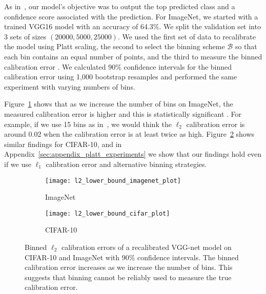 As in~\cite{guo2017calibration}, our model's objective was to output the top predicted class and a confidence score associated with the prediction. For ImageNet, we started with a trained VGG16 model with an accuracy of 64.3\%. We split the validation set into 3 sets of sizes $(20000, 5000, 25000)$. We used the first set of data to recalibrate the model using Platt scaling, the second to select the binning scheme $\mathcal{B}$ so that each bin contains an equal number of points, and the third to measure the binned calibration error . We calculated $90\%$ confidence intervals for the binned calibration error using 1,000 bootstrap resamples and performed the same experiment with varying numbers of bins.

Figure~\ref{fig:imagenet_lower_bound} shows that as we increase the number of bins on ImageNet, the measured calibration error is higher and this is statistically significant . For example, if we use 15 bins as in~\cite{guo2017calibration}, we would think the $\ell_2$ calibration error is around 0.02 when the calibration error is at least twice as high. Figure~\ref{fig:cifar_10_lower_bound} shows similar findings for CIFAR-10, and in Appendix~\ref{sec:appendix_platt_experiments} we show that our findings hold even if we use $\ell_1$ calibration error and alternative binning strategies.

\begin{figure}
     \centering
     \begin{subfigure}[b]{0.4\textwidth}
         \centering
         \texttt{[image: l2\_lower\_bound\_imagenet\_plot]}
         \caption{ImageNet}
         \label{fig:imagenet_lower_bound}
     \end{subfigure}
     \hfill
     \begin{subfigure}[b]{0.4\textwidth}
         \centering
         \texttt{[image: l2\_lower\_bound\_cifar\_plot]}
         \caption{CIFAR-10}
         \label{fig:cifar_10_lower_bound}
     \end{subfigure}
        \caption{
          Binned $\ell_2$ calibration errors of a recalibrated VGG-net model on CIFAR-10 and ImageNet  with $90\%$ confidence intervals. The binned calibration error increases as we increase the number of bins. This suggests that binning cannot be reliably used to measure the true calibration error.
        }
        \label{fig:lower_bounds}
\end{figure}


